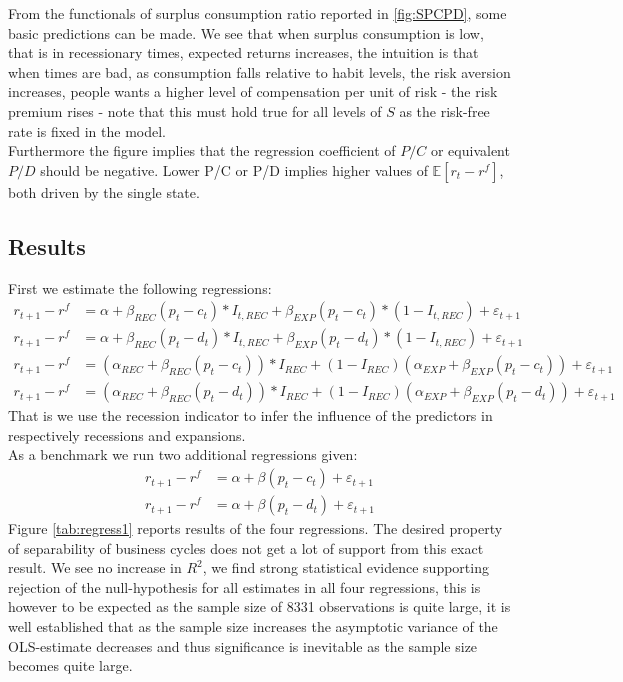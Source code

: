 From the functionals of surplus consumption ratio reported in \ref{fig:SPCPD}, some basic predictions can be made. We see that when surplus consumption is low, that is in recessionary times, expected returns increases, the intuition is that when times are bad, as consumption falls relative to habit levels, the risk aversion increases, people wants a higher level of compensation per unit of risk - the risk premium rises - note that this must hold true for all levels of $S$ as the risk-free rate is fixed in the model. \\
Furthermore the figure implies that the regression coefficient of $P/C$ or equivalent $P/D$ should be negative. Lower P/C or P/D implies higher values of $\mathbb{E}\left[r_t-r^f\right]$, both driven by the single state. 


\subsection{Results}
First we estimate the following regressions:
\begin{align*}
     r_{t+1} - r^{f} &= \alpha + \beta_{REC} \left( p_t - c_t \right) * I_{t,REC} + \beta_{EXP} \left( p_t - c_t \right) * \left(1 - I_{t,REC}\right)  + \varepsilon_{t+1}\\
      r_{t+1} - r^{f} &= \alpha + \beta_{REC} \left( p_t - d_t \right) * I_{t,REC} + \beta_{EXP} \left( p_t - d_t \right) * \left(1 - I_{t,REC}\right)  + \varepsilon_{t+1}\\
      r_{t+1} - r^{f} &= \left(\alpha_{REC} + \beta_{REC} \left(p_t - c_t\right)\right)*I_{REC} + \left(1-I_{REC}\right) \left( \alpha_{EXP} + \beta_{EXP}\left(p_t - c_t \right) \right) + \varepsilon_{t+1}\\
r_{t+1} - r^{f} &= \left(\alpha_{REC} + \beta_{REC} \left(p_t - d_t\right)\right)*I_{REC} + \left(1-I_{REC}\right) \left( \alpha_{EXP} + \beta_{EXP}\left(p_t - d_t \right) \right) + \varepsilon_{t+1}      
\end{align*}
That is we use the recession indicator to infer the influence of the predictors in respectively recessions and expansions.\\
As a benchmark we run two additional regressions given:
\begin{align*}
     r_{t+1} - r^{f} &= \alpha + \beta \left( p_t - c_t \right)  + \varepsilon_{t+1}\\
      r_{t+1} - r^{f} &= \alpha + \beta \left( p_t - d_t \right) + \varepsilon_{t+1}
\end{align*}
Figure \ref{tab:regress1} reports results of the four regressions. The desired property of separability of business cycles does not get a lot of support from this exact result. We see no increase in $R^2$, we find strong statistical evidence supporting rejection of the null-hypothesis for all estimates in all four regressions, this is however to be expected as the sample size of 8331 observations is quite large, it is well established that as the sample size increases the asymptotic variance of the OLS-estimate decreases and thus significance is inevitable as the sample size becomes quite large.


